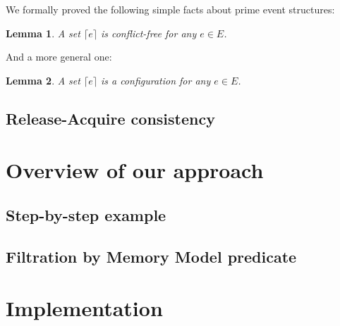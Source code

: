 \documentclass[conference]{IEEEtran}
\newtheorem{lemma}{Lemma}
\begin{document}
We formally proved the following simple facts about prime event structures:

\begin{lemma}
  A set $\lceil e \rceil$ is conflict-free for any $e \in E$.
\end{lemma}

And a more general one:

\begin{lemma}
  A set $\lceil e \rceil$ is a configuration for any $e \in E$.
\end{lemma}

\subsection{Release-Acquire consistency}


\section{Overview of our approach}

\subsection{Step-by-step example}

\subsection{Filtration by Memory Model predicate}


\section{Implementation}
\end{document}
